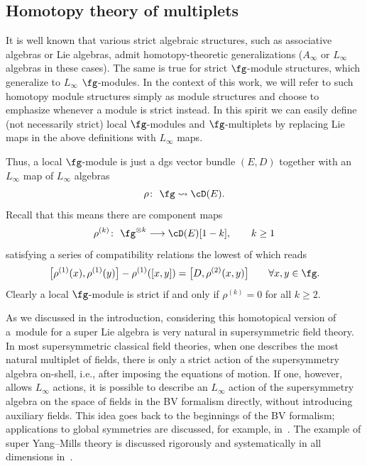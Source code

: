 \documentclass[10pt,a4paper]{amsart}
\numberwithin{equation}{section}
\begin{document}
\subsection{Homotopy theory of multiplets}
%
It is well known that various strict algebraic structures, such as associative algebras or Lie algebras, admit homotopy-theoretic generalizations ($A_\infty$ or $L_\infty$ algebras in these cases). The same is true for strict $\fg$-module structures,
which generalize to $L_\infty$ $\fg$-modules. In the context of this work, we will refer to such homotopy module structures simply as module structures and choose to emphasize whenever a module is strict instead. In this spirit we can easily define (not necessarily strict) local $\fg$-modules and $\fg$-multiplets by replacing Lie maps in the above definitions with $L_\infty$ maps.

Thus, a local $\fg$-module is just a dgs vector bundle $(E,D)$ together with an $L_\infty$ map of $L_\infty$ algebras
\begin{equation*}
\rho \colon \ \fg \rightsquigarrow \cD(E) .
\end{equation*}
Recall that this means there are component maps
\begin{equation*}
\rho^{(k)} \colon \ \fg^{\otimes k} \longrightarrow \cD(E)[1-k], \qquad k \geq 1
\end{equation*}
satisfying a series of compatibility relations the lowest of which reads
\begin{equation*}%
\big[\rho^{(1)}(x),\rho^{(1)}(y)\big] - \rho^{(1)}([x,y]) =\big[D, \rho^{(2)}(x,y)\big] \qquad \forall x,y \in \fg.
\end{equation*}
Clearly a local $\fg$-module is strict if and only if $\rho^{(k)} = 0$ for all $k\geq2$.

\begin{rmk}
	As we discussed in the introduction, considering this homotopical version of a~module for a super Lie algebra is very natural in supersymmetric field theory. In most supersymmetric classical field theories, when one describes the most natural multiplet of fields, there is only a strict action of the supersymmetry algebra on-shell, i.e., after imposing the equations of motion. If one, however, allows $L_\infty$ actions, it is possible to describe an $L_\infty$ action of the supersymmetry algebra on the space of fields in the BV formalism directly, without introducing auxiliary fields. This idea goes back to the beginnings of the BV formalism; applications to global symmetries are discussed, for example, in~\cite{BaulieuSusy}. The example of super Yang--Mills theory is discussed rigorously and systematically in all dimensions in~\cite{ESW}.
\end{rmk}
\end{document}
